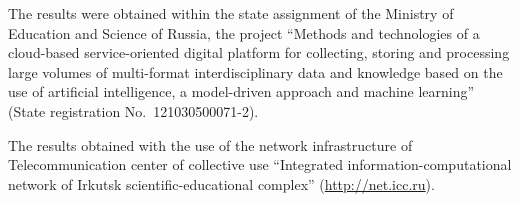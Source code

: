 \documentclass[
]{ceurart}
\begin{document}
\begin{acknowledgments}

The results were obtained within the state assignment of the Ministry of Education and Science of Russia, the project ``Methods and technologies of a cloud-based service-oriented digital platform for collecting, storing and processing large volumes of multi-format interdisciplinary data and knowledge based on the use of artificial intelligence, a model-driven approach and machine learning'' (State registration No.~121030500071-2).

  The results obtained with the use of the network infrastructure of Telecommunication center of collective use ``Integrated information-computational network of Irkutsk scientific-educational complex'' (\url{http://net.icc.ru}).
\end{acknowledgments}

% 
\end{document}
